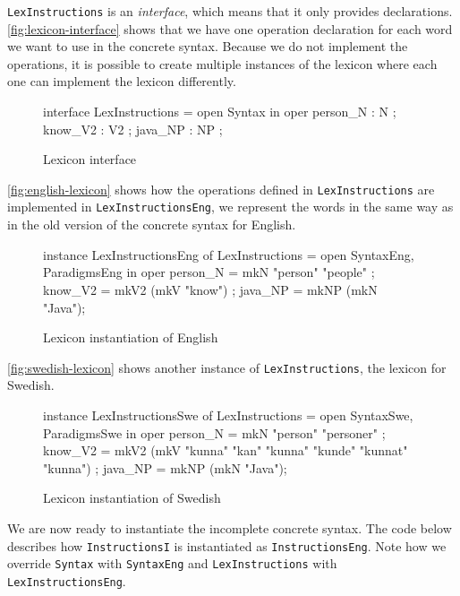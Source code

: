 \texttt{LexInstructions} is an \emph{interface}, which means that it only provides declarations. \autoref{fig:lexicon-interface} shows that we have one operation declaration for each word we want to use in the concrete syntax. Because we do not implement the operations, it is possible to create multiple instances of the lexicon where each one can implement the lexicon differently.

\begin{figure}[H]
\begin{code}
interface LexInstructions = open Syntax in {
   oper
     person_N : N ;
     know_V2 : V2 ;
     java_NP : NP ;
}
\end{code}
\caption{Lexicon interface\label{fig:lexicon-interface}}
\end{figure}

\autoref{fig:english-lexicon} shows how the operations defined in \texttt{LexInstructions} are implemented in \texttt{LexInstructionsEng}, we represent the words in the same  way as in the old version of the concrete syntax for English.

\begin{figure}[H]
\begin{code}
instance LexInstructionsEng of LexInstructions = open SyntaxEng, ParadigmsEng in {
    oper
      person_N = mkN "person" "people" ;
      know_V2 = mkV2 (mkV "know") ;	  
      java_NP = mkNP (mkN "Java");
}
\end{code}
\caption{Lexicon instantiation of English \label{fig:english-lexicon}}
\end{figure}

\autoref{fig:swedish-lexicon} shows another instance of \texttt{LexInstructions}, the lexicon for Swedish.

\begin{figure}[H]
\begin{code}
instance LexInstructionsSwe of LexInstructions = open SyntaxSwe, ParadigmsSwe in {
    oper
      person_N = mkN "person" "personer" ;
      know_V2 = mkV2 (mkV "kunna" "kan" "kunna" "kunde" "kunnat" "kunna") ;	  
      java_NP = mkNP (mkN "Java");
}
\end{code}
\caption{Lexicon instantiation of Swedish\label{fig:swedish-lexicon}}
\end{figure}

We are now ready to instantiate the incomplete concrete syntax. The code below describes how \texttt{InstructionsI} is instantiated as \texttt{InstructionsEng}. Note how we override \texttt{Syntax} with \texttt{SyntaxEng} and \texttt{LexInstructions} with \texttt{LexInstructionsEng}.

